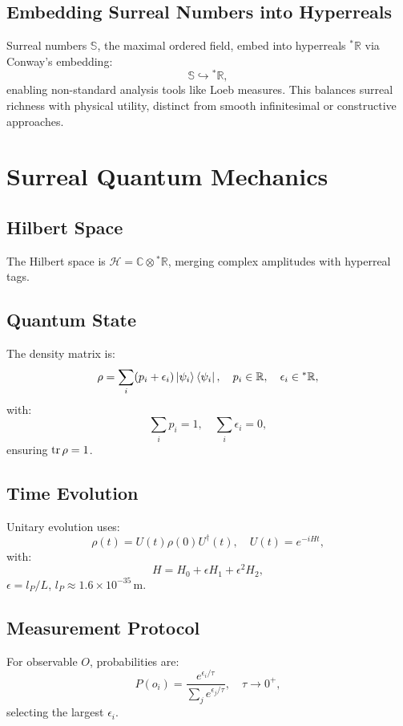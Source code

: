 \documentclass{article}
\begin{document}
\subsection{Embedding Surreal Numbers into Hyperreals}
Surreal numbers \(\mathbb{S}\), the maximal ordered field, embed into hyperreals \({}^*\mathbb{R}\) via Conway’s embedding:
\begin{equation}
\mathbb{S} \hookrightarrow {}^*\mathbb{R},
\end{equation}
enabling non-standard analysis tools like Loeb measures. This balances surreal richness with physical utility, distinct from smooth infinitesimal or constructive approaches.

\section{Surreal Quantum Mechanics}
\subsection{Hilbert Space}
The Hilbert space is \(\mathcal{H} = \mathbb{C} \otimes {}^*\mathbb{R}\), merging complex amplitudes with hyperreal tags.

\subsection{Quantum State}
The density matrix is:
\begin{equation}
\rho = \sum_i (p_i + \epsilon_i) \ket{\psi_i}\bra{\psi_i}, \quad p_i \in \mathbb{R}, \quad \epsilon_i \in {}^*\mathbb{R},
\end{equation}
with:
\begin{equation}
\sum_i p_i = 1, \quad \sum_i \epsilon_i = 0,
\end{equation}
ensuring \(\tr \rho = 1\).

\subsection{Time Evolution}
Unitary evolution uses:
\begin{equation}
\rho(t) = U(t) \rho(0) U^\dagger(t), \quad U(t) = e^{-i H t},
\end{equation}
with:
\begin{equation}
H = H_0 + \epsilon H_1 + \epsilon^2 H_2,
\end{equation}
\(\epsilon = l_P / L\), \(l_P \approx 1.6 \times 10^{-35} \, \text{m}\).

\subsection{Measurement Protocol}
For observable \(O\), probabilities are:
\begin{equation}
P(o_i) = \frac{e^{\epsilon_i / \tau}}{\sum_j e^{\epsilon_j / \tau}}, \quad \tau \to 0^+,
\end{equation}
selecting the largest \(\epsilon_i\).
\end{document}
